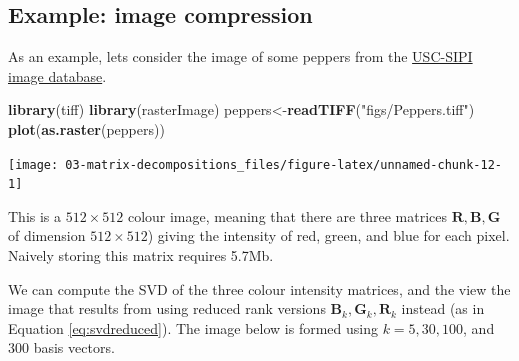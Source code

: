 \documentclass[]{book}
\newenvironment{Shaded}{\begin{snugshade}}{\end{snugshade}}
\newcommand{\KeywordTok}[1]{\textcolor[rgb]{0.13,0.29,0.53}{\textbf{#1}}}
\newcommand{\NormalTok}[1]{#1}
\newcommand{\StringTok}[1]{\textcolor[rgb]{0.31,0.60,0.02}{#1}}
\theoremstyle{definition}
\theoremstyle{definition}
\theoremstyle{definition}
\theoremstyle{remark}
\begin{document}
\hypertarget{example-image-compression}{%
\subsection{Example: image compression}\label{example-image-compression}}

As an example, lets consider the image of some peppers from the \href{http://sipi.usc.edu/database/}{USC-SIPI image database}.

\begin{Shaded}
\begin{Highlighting}[]
\KeywordTok{library}\NormalTok{(tiff)}
\KeywordTok{library}\NormalTok{(rasterImage)}
\NormalTok{peppers<-}\KeywordTok{readTIFF}\NormalTok{(}\StringTok{"figs/Peppers.tiff"}\NormalTok{)}
\KeywordTok{plot}\NormalTok{(}\KeywordTok{as.raster}\NormalTok{(peppers))}
\end{Highlighting}
\end{Shaded}

\texttt{[image: 03-matrix-decompositions\_files/figure-latex/unnamed-chunk-12-1]}

This is a \(512 \times 512\) colour image, meaning that there are three matrices \(\mathbf R, \mathbf B,\mathbf G\) of dimension \(512\times 512\)) giving the intensity of red, green, and blue for each pixel.
Naively storing this matrix requires 5.7Mb.

We can compute the SVD of the three colour intensity matrices, and the view the image that results from using reduced rank versions \(\mathbf B_k, \mathbf G_k, \mathbf R_k\) instead (as in Equation \eqref{eq:svdreduced}). The image below is formed using \(k=5, 30, 100\), and \(300\) basis vectors.
\end{document}
